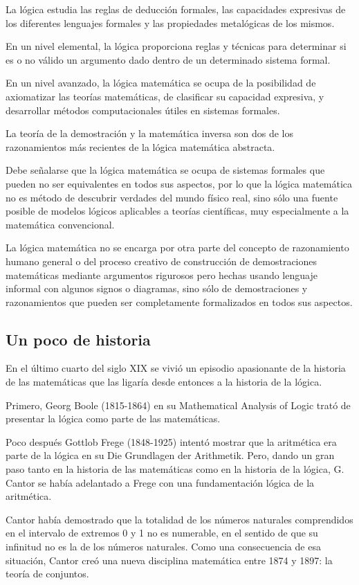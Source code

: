 La lógica estudia las reglas de deducción formales, las capacidades
expresivas de los diferentes lenguajes formales y las propiedades
metalógicas de los mismos. 

En un nivel elemental, la lógica proporciona reglas y técnicas para
determinar si es o no válido un argumento dado dentro de un determinado
sistema formal. 

En un nivel avanzado, la lógica matemática se ocupa de la posibilidad
de axiomatizar las teorías matemáticas, de clasificar su capacidad
expresiva, y desarrollar métodos computacionales útiles en sistemas
formales.

La teoría de la demostración y la matemática inversa son dos de los
razonamientos más recientes de la lógica matemática abstracta. 

Debe señalarse que la lógica matemática se ocupa de sistemas formales
que pueden no ser equivalentes en todos sus aspectos, por lo que la
lógica matemática no es método de descubrir verdades del mundo físico
real, sino sólo una fuente posible de modelos lógicos aplicables a
teorías científicas, muy especialmente a la matemática convencional. 

La lógica matemática no se encarga por otra parte del concepto de
razonamiento humano general o del proceso creativo de construcción
de demostraciones matemáticas mediante argumentos rigurosos pero hechas
usando lenguaje informal con algunos signos o diagramas, sino sólo
de demostraciones y razonamientos que pueden ser completamente formalizados
en todos sus aspectos. 

\subsection{Un poco de historia}

En el último cuarto del siglo XIX se vivió un episodio apasionante
de la historia de las matemáticas que las ligaría desde entonces a
la historia de la lógica.

Primero, Georg Boole (1815-1864) en su Mathematical Analysis of Logic
trató de presentar la lógica como parte de las matemáticas. 

Poco después Gottlob Frege (1848-1925) intentó mostrar que la aritmética
era parte de la lógica en su Die Grundlagen der Arithmetik. Pero,
dando un gran paso tanto en la historia de las matemáticas como en
la historia de la lógica, G. Cantor se había adelantado a Frege con
una fundamentación lógica de la aritmética.

Cantor había demostrado que la totalidad de los números naturales
comprendidos en el intervalo de extremos 0 y 1 no es numerable, en
el sentido de que su infinitud no es la de los números naturales.
Como una consecuencia de esa situación, Cantor creó una nueva disciplina
matemática entre 1874 y 1897: la teoría de conjuntos. 


